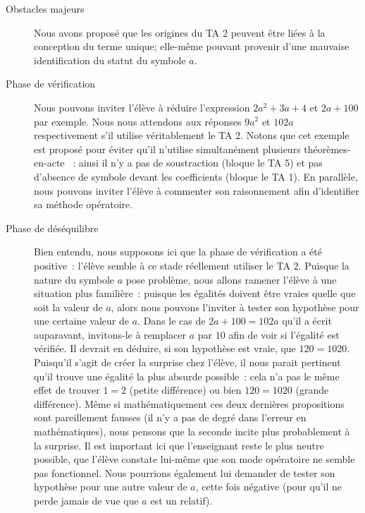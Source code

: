 \documentclass{report}
\theoremstyle{definition}
\newcommand{\tas}{théorèmes-en-acte }
\begin{document}
\begin{description}
\item[Obstacles majeurs] Nous avons proposé que les origines du TA 2 peuvent être liées à la conception du terme unique; elle-même pouvant provenir d'une mauvaise identification du statut du symbole $a$.
\item[Phase de vérification] Nous pouvons inviter l'élève à réduire l'expression $2a^2+3a+4$ et $2a+100$ par exemple. Nous nous attendons aux réponses $9a^2$ et $102a$ respectivement s'il utilise véritablement le TA 2. Notons que cet exemple est proposé pour éviter qu'il n'utilise simultanément plusieurs \tas~: ainsi il n'y a pas de soustraction (bloque le TA 5) et pas d'absence de symbole devant les coefficients (bloque le TA 1). En parallèle, nous pouvons inviter l'élève à commenter son raisonnement afin d'identifier sa méthode opératoire.
\item[Phase de déséquilibre] Bien entendu, nous supposons ici que la phase de vérification a été positive~: l'élève semble à ce stade réellement utiliser le TA 2. Puisque la nature du symbole $a$ pose problème, nous allons ramener l'élève à une situation plus familière~: puisque les égalités doivent être vraies quelle que soit la valeur de $a$, alors nous pouvons l'inviter à tester son hypothèse pour une certaine valeur de $a$. Dans le cas de $2a+100=102a$ qu'il a écrit auparavant, invitons-le à remplacer $a$ par $10$ afin de voir si l'égalité est vérifiée. Il devrait en déduire, si son hypothèse est vraie, que $120=1020$. Puisqu'il s'agit de créer la surprise chez l'élève, il nous parait pertinent qu'il trouve une égalité la plus absurde possible~: cela n'a pas le même effet de trouver $1=2$ (petite différence) ou bien $120=1020$ (grande différence). Même si mathématiquement ces deux dernières propositions sont pareillement fausses (il n'y a pas de degré dans l'erreur en mathématiques), nous pensons que la seconde incite plus probablement à la surprise. Il est important ici que l'enseignant reste le plus neutre possible, que l'élève constate lui-même que son mode opératoire ne semble pas fonctionnel. Nous pourrions également lui demander de tester son hypothèse pour une autre valeur de $a$, cette fois négative (pour qu'il ne perde jamais de vue que $a$ est un relatif).

\end{description}
\end{document}
